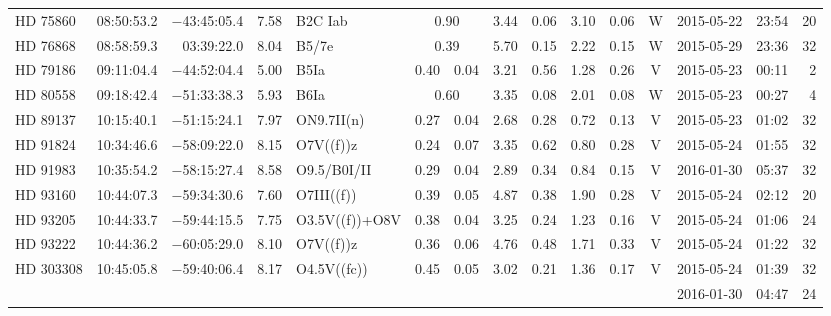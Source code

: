 \begin{tiny}
\begin{longtable}{lrrrll@{$\,\pm$\,}rl@{$\,\pm$\,}rl@{$\,\pm$\,}rcrrr}
HD 75860      &08:50:53.2&  $-$43:45:05.4&        7.58&  B2C Iab&\multicolumn{2}{c}{0.90}&   3.44 & 0.06 &      3.10 & 0.06 &    W  &2015-05-22 &23:54&   20\\  %
HD 76868      &08:58:59.3&     03:39:22.0&        8.04&  B5/7e &\multicolumn{2}{c}{0.39}&    5.70 & 0.15 &      2.22 & 0.15 &    W  &2015-05-29 &23:36&   32\\  %
HD 79186      &09:11:04.4&  $-$44:52:04.4&        5.00&  B5Ia           & 0.40 & 0.04   &    3.21 & 0.56 &      1.28 & 0.26 &    V  &2015-05-23 &00:11&    2\\  %
HD 80558      &09:18:42.4&  $-$51:33:38.3&        5.93&  B6Ia  &\multicolumn{2}{c}{0.60}&    3.35 & 0.08 &      2.01 & 0.08 &    W  &2015-05-23 &00:27&    4\\  %
HD 89137      &10:15:40.1&  $-$51:15:24.1&        7.97&  ON9.7II(n)     & 0.27 & 0.04   &    2.68 & 0.28 &      0.72 & 0.13 &    V  &2015-05-23 &01:02&   32\\  %
HD 91824      &10:34:46.6&  $-$58:09:22.0&        8.15&  O7V((f))z      & 0.24 & 0.07   &    3.35 & 0.62 &      0.80 & 0.28 &    V  &2015-05-24 &01:55&   32\\  %
HD 91983      &10:35:54.2&  $-$58:15:27.4&        8.58&  O9.5/B0I/II    & 0.29 & 0.04   &    2.89 & 0.34 &      0.84 & 0.15 &    V  &2016-01-30 &05:37&   32\\  %
HD 93160      &10:44:07.3&  $-$59:34:30.6&        7.60&  O7III((f))     & 0.39 & 0.05   &    4.87 & 0.38 &      1.90 & 0.28 &    V  &2015-05-24 &02:12&   20\\  %
HD 93205      &10:44:33.7&  $-$59:44:15.5&        7.75&  O3.5V((f))+O8V & 0.38 & 0.04   &    3.25 & 0.24 &      1.23 & 0.16 &    V  &2015-05-24 &01:06&   24\\  %
HD 93222      &10:44:36.2&  $-$60:05:29.0&        8.10&  O7V((f))z      & 0.36 & 0.06   &    4.76 & 0.48 &      1.71 & 0.33 &    V  &2015-05-24 &01:22&   32\\  %
HD 303308     &10:45:05.8&  $-$59:40:06.4&        8.17&  O4.5V((fc))    & 0.45 & 0.05   &    3.02 & 0.21 &      1.36 & 0.17 &    V  &2015-05-24 &01:39&   32\\  %
              &          &               &            &                 & \multicolumn{6}{c}{}                              &       &2016-01-30 &04:47&   24\\  %

\end{longtable}
\end{tiny}
